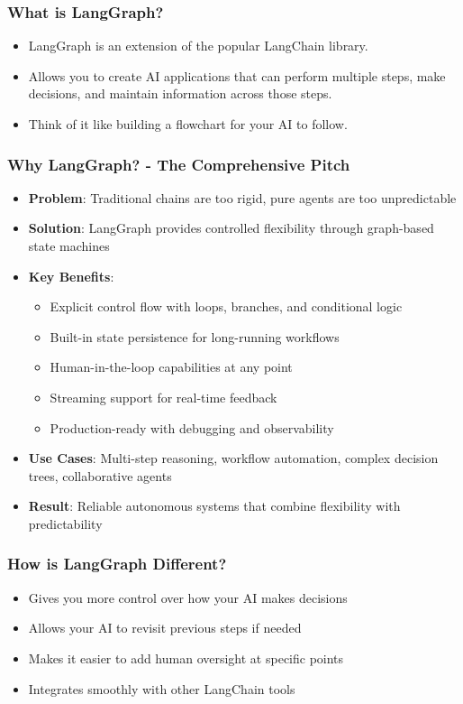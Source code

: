 \begin{frame}[fragile]\frametitle{What is LangGraph?}
      \begin{itemize}
        \item LangGraph is an extension of the popular LangChain library. 
		\item Allows you to create AI applications that can perform multiple steps, make decisions, and maintain information across those steps. 
		\item Think of it like building a flowchart for your AI to follow.
      \end{itemize}
\end{frame}

\begin{frame}[fragile]\frametitle{Why LangGraph? - The Comprehensive Pitch}
      \begin{itemize}
        \item \textbf{Problem}: Traditional chains are too rigid, pure agents are too unpredictable
        \item \textbf{Solution}: LangGraph provides controlled flexibility through graph-based state machines
        \item \textbf{Key Benefits}:
        \begin{itemize}
            \item Explicit control flow with loops, branches, and conditional logic
            \item Built-in state persistence for long-running workflows
            \item Human-in-the-loop capabilities at any point
            \item Streaming support for real-time feedback
            \item Production-ready with debugging and observability
        \end{itemize}
        \item \textbf{Use Cases}: Multi-step reasoning, workflow automation, complex decision trees, collaborative agents
        \item \textbf{Result}: Reliable autonomous systems that combine flexibility with predictability
      \end{itemize}
\end{frame}

\begin{frame}[fragile]\frametitle{How is LangGraph Different?}
      \begin{itemize}
        \item Gives you more control over how your AI makes decisions
        \item Allows your AI to revisit previous steps if needed
        \item Makes it easier to add human oversight at specific points
        \item Integrates smoothly with other LangChain tools
      \end{itemize}
\end{frame}

